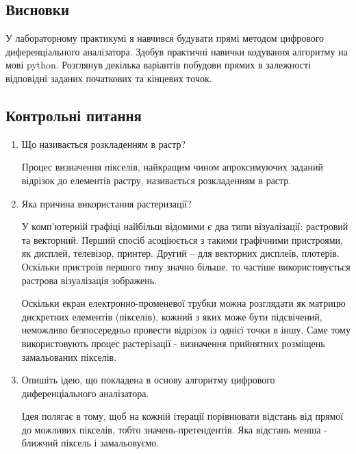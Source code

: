 \documentclass[a4paper,14pt]{extarticle}
\begin{document}
\subsection*{Висновки}

У лабораторному практикумі я навчився будувати прямі методом 
цифрового диференціального аналізатора. Здобув практичні навички 
кодування алгоритму на мові python. Розглянув декілька варіантів побудови 
прямих в залежності відповідні заданих початкових та кінцевих точок.

\subsection*{Контрольні питання}

\begin{enumerate}

    \item Що називається розкладенням в растр?

    Процес визначення пікселів, найкращим чином апроксимуючих 
    заданий відрізок до елементів растру, називається 
    розкладенням в растр.

    \item Яка причина використання растеризації?

    У комп’ютерній графіці найбільш відомими є два типи 
    візуалізації: растровий та векторний. Перший спосіб 
    асоціюється з такими графічними пристроями, як дисплей, 
    телевізор, принтер. Другий – для векторних дисплеїв, 
    плотерів. Оскільки пристроїв першого типу значно більше, то 
    частіше використовується растрова візуалізація зображень.

    Оскільки екран електронно-променевої трубки можна розглядати 
    як матрицю дискретних елементів (пікселів), кожний з яких 
    може бути підсвічений, неможливо безпосередньо провести 
    відрізок із однієї точки в іншу. Саме тому використовують 
    процес растерізації - визначення прийнятних розміщень 
    замальованих пікселів.

    \item Опишіть ідею, що покладена в основу алгоритму цифрового 
    диференціального аналізатора.

    Ідея полягає в тому, щоб на кожній ітерації порівнювати 
    відстань від прямої до можливих пікселів, тобто 
    значень-претендентів. Яка відстань менша - ближчий піксель 
    і замальовуємо.

\end{enumerate}
\end{document}

